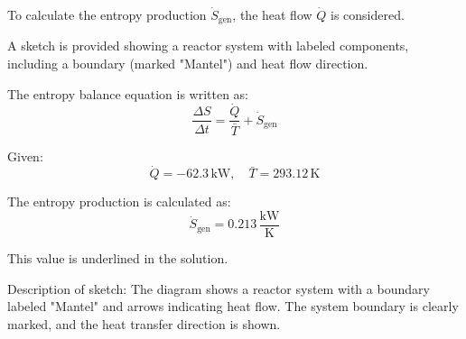 To calculate the entropy production \( \dot{S}_{\text{gen}} \), the heat flow \( \dot{Q} \) is considered.  

A sketch is provided showing a reactor system with labeled components, including a boundary (marked "Mantel") and heat flow direction.  

The entropy balance equation is written as:  
\[
\frac{\Delta S}{\Delta t} = \frac{\dot{Q}}{\bar{T}} + \dot{S}_{\text{gen}}
\]  

Given:  
\[
\dot{Q} = -62.3 \, \text{kW}, \quad \bar{T} = 293.12 \, \text{K}
\]  

The entropy production is calculated as:  
\[
\dot{S}_{\text{gen}} = 0.213 \, \frac{\text{kW}}{\text{K}}
\]  

This value is underlined in the solution.  

Description of sketch:  
The diagram shows a reactor system with a boundary labeled "Mantel" and arrows indicating heat flow. The system boundary is clearly marked, and the heat transfer direction is shown.